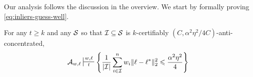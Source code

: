 





Our analysis follows the discussion in the overview. 
We start by formally proving \eqref{eq:inliers-guess-well}. 

\begin{lemma}
For any $t \geq k$ and  any $\mathcal S$ so that $\mathcal I \subseteq \mathcal S$ is $k$-certifiably $(C,\alpha^2\eta^2/4C)$-anti-concentrated,
\[
\cA_{w,\ell} \sststile{t}{w,\ell} \Set{\frac{1}{|\cI|}\sum_{i \in \cI}^n w_i \|\ell - \ell^*\|^2_2\leq \frac{\alpha^2\eta^2}{4}}
\]
\label{lem:close-on-inliers}
\end{lemma}

